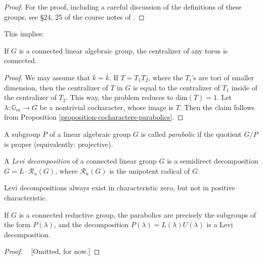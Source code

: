 \begin{proof}
 For the proof, including a careful discussion of the definitions of these groups, see \S 24, 25 of the course notes of \cite{Conrad-AG1}.
\end{proof}




This implies:

\begin{proposition}
\label{proposition-centralizers-tori-connected}
 If $G$ is a connected linear algebraic group, the centralizer of any torus is connected. 
\end{proposition}

\begin{proof}
 We may assume that $k=\bar k$. If $T=T_1T_2$, where the $T_i$'s are tori of smaller dimension, then the centralizer of $T$ in $G$ is equal to the centralizer of $T_1$ inside of the centralizer of $T_2$. This way, the problem reduces to $\text{dim}(T)=1$. Let $\lambda:\mathbb G_m\to G$ be a nontrivial cocharacter, whose image is $T$. Then the claim follows from Proposition \ref{proposition-cocharacters-parabolics}.
\end{proof}


\begin{definition}
 \label{definition-parabolic}
A subgroup $P$ of a linear algebraic group $G$ is called {\it parabolic} if the quotient $G/P$ is proper (equivalently: projective). 
\end{definition}



\begin{definition}
 \label{definition-Levi-decomposition}
A {\it Levi decomposition} of a connected linear group $G$ is a semidirect decomposition $G=L\cdot \mathcal R_u(G)$, where $\mathcal R_u(G)$ is the unipotent radical of $G$. 
\end{definition}

Levi decompositions always exist in characteristic zero, but not in positive characteristic.

\begin{theorem}
 \label{theorem-parabolics-in-reductive}
If $G$ is a connected reductive group, the parabolics are precisely the subgroups of the form $P(\lambda)$, and the decomposition $P(\lambda)=L(\lambda)U(\lambda)$ is a Levi decomposition.
\end{theorem}

\begin{proof}
 ~ [Omitted, for now.]
\end{proof}







